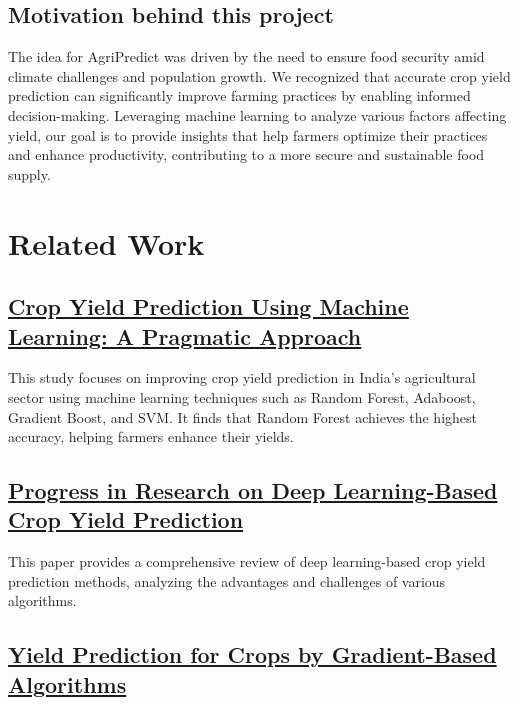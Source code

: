\documentclass[10pt,twocolumn,letterpaper]{article}
\begin{document}
\subsection{Motivation behind this project}

The idea for AgriPredict was driven by the need to ensure food security amid climate challenges and population growth. We recognized that accurate crop yield prediction can significantly improve farming practices by enabling informed decision-making. Leveraging machine learning to analyze various factors affecting yield, our goal is to provide insights that help farmers optimize their practices and enhance productivity, contributing to a more secure and sustainable food supply.

\section{Related Work}

\subsection{\href{https://www.researchgate.net/publication/381910719_Crop_Yield_Prediction_Using_Machine_Learning_A_Pragmatic_Approach}{Crop Yield Prediction Using Machine Learning: A Pragmatic Approach}}

This study focuses on improving crop yield prediction in India's agricultural sector using machine learning techniques such as Random Forest, Adaboost, Gradient Boost, and SVM. It finds that Random Forest achieves the highest accuracy, helping farmers enhance their yields.
\subsection{\href{https://www.mdpi.com/2073-4395/14/10/2264?form=MG0AV3}{Progress in Research on Deep Learning-Based Crop Yield Prediction}}

This paper provides a comprehensive review of deep learning-based crop yield prediction methods, analyzing the advantages and challenges of various algorithms.

\subsection{\href{https://journals.plos.org/plosone/article?id=10.1371/journal.pone.0291928}{Yield Prediction for Crops by Gradient-Based Algorithms}}
\end{document}

